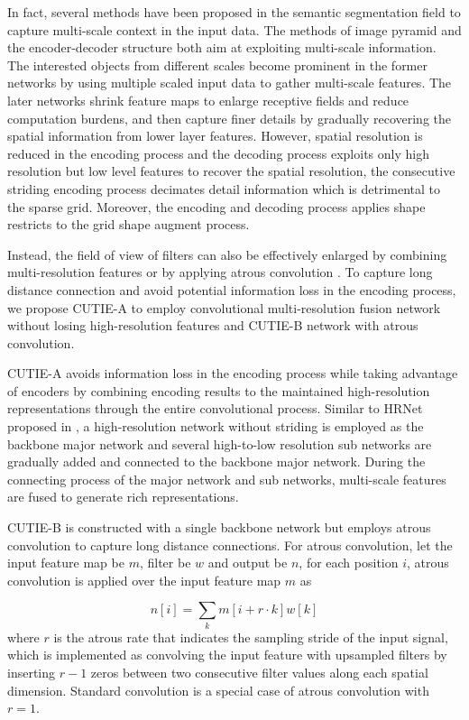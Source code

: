 \documentclass[10pt,twocolumn,letterpaper]{article}
\begin{document}
In fact, several methods have been proposed in the semantic segmentation field to capture multi-scale context in the input data. The methods of image pyramid and the encoder-decoder structure both aim at exploiting multi-scale information. The interested objects from different scales become prominent in the former networks by using multiple scaled input data to gather multi-scale features. The later networks shrink feature maps to enlarge receptive fields and reduce computation burdens, and then capture finer details by gradually recovering the spatial information from lower layer features. However, spatial resolution is reduced in the encoding process and the decoding process exploits only high resolution but low level features to recover the spatial resolution, the consecutive striding encoding process decimates detail information which is detrimental to the sparse grid. Moreover, the encoding and decoding process applies shape restricts to the grid shape augment process. 

Instead, the field of view of filters can also be effectively enlarged by combining multi-resolution features \cite{hrnet} or by applying atrous convolution \cite{deeplab, deeplabv1, deeplabv3, deeplabv3p}. To capture long distance connection and avoid potential information loss in the encoding process, we propose CUTIE-A to employ convolutional multi-resolution fusion network without losing high-resolution features and CUTIE-B network with atrous convolution. 

CUTIE-A avoids information loss in the encoding process while taking advantage of encoders by combining encoding results to the maintained high-resolution representations through the entire convolutional process. Similar to HRNet proposed in \cite{hrnet}, a high-resolution network without striding is employed as the backbone major network and several high-to-low resolution sub networks are gradually added and connected to the backbone major network. During the connecting process of the major network and sub networks, multi-scale features are fused to generate rich representations.

CUTIE-B is constructed with a single backbone network but employs atrous convolution to capture long distance connections. For atrous convolution, let the input feature map be $m$, filter be $w$ and output be $n$, for each position $i$, atrous convolution is applied over the input feature map $m$ as 

\begin{equation}
n[i] = \sum_k m[i+r\cdot k]w[k]
\end{equation}
where $r$ is the atrous rate that indicates the sampling stride of the input signal, which is implemented as convolving the input feature with upsampled filters by inserting $r-1$ zeros between two consecutive filter values along each spatial dimension. Standard convolution is a special case of atrous convolution with $r=1$.
\end{document}

